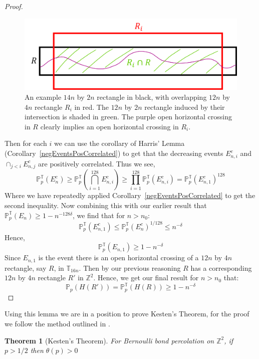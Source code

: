 \documentclass[a4paper,11pt]{article}
\newtheorem{theorem}{Theorem}[section]
\theoremstyle{definition}
\newcommand{\ints}{\mathbb{Z}}
\newcommand{\prob}{\mathbb{P}_p}
\newcommand{\probtorus}{\mathbb{P}^{\mathbb{T}}_{p}}
\begin{document}
\begin{proof}
	\begin{figure}
		\centering
		\includegraphics[scale=0.8]{drawings/rectangleOverlap.png}
		\caption{An example $14n$ by $2n$ rectangle in black, with overlapping $12n$ by $4n$ rectangle $R_i$ in red. The $12n$ by $2n$ rectangle induced by their intersection is shaded in green. The purple open horizontal crossing in $R$ clearly implies an open horizontal crossing in $R_i$.}
		\label{fig:rectangleOverlap}
	\end{figure}

	Then for each $i$ we can use the corollary of Harris' Lemma (Corollary~\ref*{negEventsPosCorrelated}) to get that the decreasing events $E^c_{n,i}$ and $\cap_{j<i}E^c_{n,j}$ are positively correlated. Thus we see,
	$$\probtorus(E^c_n) \geq \probtorus\left(\bigcap^{128}_{i=1}E^c_{n,i}\right) \geq \prod_{i=1}^{128}\probtorus(E^c_{n,i}) = \probtorus(E^c_{n,1})^{128}$$
	Where we have repeatedly applied Corollary~\ref*{negEventsPosCorrelated} to get the second inequality.
	Now combining this with our earlier result that $\probtorus(E_n) \geq 1-n^{-128 \delta}$, we find that for $n> n_0$:
	$$\probtorus(E_{n,1}^c) \leq \probtorus(E_n^c)^{1/128} \leq n^{- \delta}$$
	Hence,
	$$\probtorus(E_{n,1}) \geq 1- n^{- \delta}$$
	Since $E_{n,1}$ is the event there is an open horizontal crossing of a $12n$ by $4n$ rectangle, say $R$, in $\mathbb{T}_{16n}$. Then by our previous reasoning $R$ has a corresponding $12n$ by $4n$ rectangle $R'$ in $\ints^2$. 
	Hence, we get our final result for $n>n_0$ that:
	$$\prob(H(R')) = \probtorus(H(R)) \geq 1-n^{-\delta}$$
\end{proof}

Using this lemma we are in a position to prove Kesten's Theorem, for the proof we follow the method outlined in \cite{bollo2006}.

\begin{theorem}[Kesten's Theorem]
	For Bernoulli bond percolation on $\ints^2$, if $p>1/2$ then $\theta(p) > 0$
\end{theorem}
\end{document}
